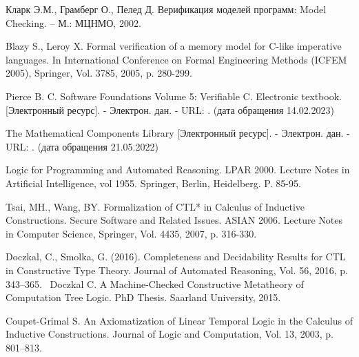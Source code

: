 \documentclass[12pt]{article}
\begin{document}
\newpage
{}%
  \begin{thebibliography}{99}%
   Кларк Э.М., Грамберг О., Пелед Д. Верификация моделей программ: Model Checking. – М.: МЦНМО, 2002.
    
     Blazy S., Leroy X. Formal verification of a memory model for C-like imperative languages. In International Conference on Formal Engineering Methods (ICFEM 2005), Springer, Vol. 3785, 2005, p. 280-299.
    
     Pierce B. C. Software Foundations Volume 5: Verifiable C. Electronic textbook. [Электронный ресурс]. - Электрон. дан. - URL: . (дата обращения 14.02.2023)
    
    The Mathematical Components Library [Электронный ресурс]. - Электрон. дан. - URL: . (дата обращения 21.05.2022)

      Logic for Programming and Automated Reasoning. LPAR 2000. Lecture Notes in Artificial Intelligence, vol 1955. Springer, Berlin, Heidelberg. P. 85-95.

     Tsai, MH., Wang, BY. Formalization of CTL* in Calculus of Inductive Constructions. Secure Software and Related Issues. ASIAN 2006. Lecture Notes in Computer Science, Springer, Vol. 4435,  2007, p. 316-330.

     Doczkal, C., Smolka, G. (2016). Completeness and Decidability Results for CTL in Constructive Type Theory. Journal of Automated Reasoning, Vol. 56, 2016, p. 343–365. 
     Doczkal C. A Machine-Checked Constructive Metatheory of Computation Tree Logic. PhD Thesis. Saarland University, 2015.

     Coupet-Grimal S. An Axiomatization of Linear Temporal Logic in the Calculus of Inductive Constructions. Journal of Logic and Computation, Vol. 13, 2003, p. 801–813.
    

\end{thebibliography}
\end{document}
